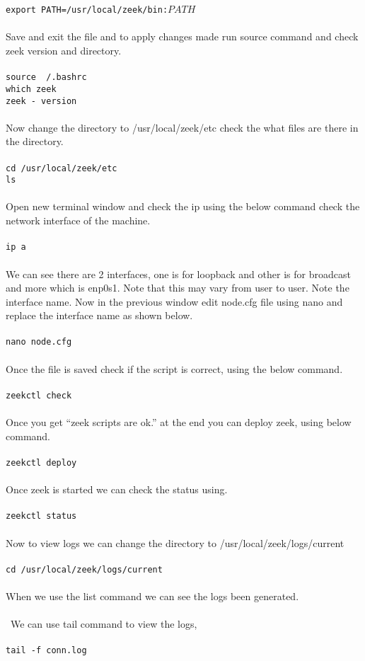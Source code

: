 \\\\
\texttt{export PATH=/usr/local/zeek/bin:$PATH$}
\\\\
Save and exit the file and to apply changes made run source command and check zeek version and directory.
\\\\
\texttt{source ~/.bashrc}\\
\texttt{which zeek}\\
\texttt{zeek - version}
\\\\
Now change the directory to /usr/local/zeek/etc check the what files are there in the directory.
\\\\
\texttt{cd /usr/local/zeek/etc}\\
\texttt{ls}
\\\\
Open new terminal window and check the ip using the below command check the network interface of the machine.
\\\\
\texttt{ip a}
\\\\
We can see there are 2 interfaces, one is for loopback and other is for broadcast and more which is enp0s1. Note that this may vary from user to user. Note the interface name. Now in the previous window edit node.cfg file using nano and replace the interface name as shown below.
\\\\
\texttt{nano node.cfg}
\\\\
Once the file is saved check if the script is correct, using the below command.
\\\\
\texttt{zeekctl check}
\\\\
Once you get “zeek scripts are ok.” at the end you can deploy zeek, using below command.
\\\\
\texttt{zeekctl deploy}
\\\\
Once zeek is started we can check the status using.
\\\\
\texttt{zeekctl status}
\\\\
Now to view logs we can change the directory to /usr/local/zeek/logs/current
\\\\
\texttt{cd /usr/local/zeek/logs/current}
\\\\
When we use the list command we can see the logs been generated.
\\\\\
We can use tail command to view the logs,
\\\\
\texttt{tail -f conn.log}